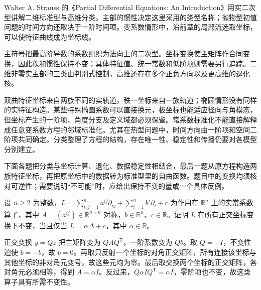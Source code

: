 \ProseParagraphBreak

Walter A. Strauss 的《Partial Differential Equations: An Introduction》\cite[Section 1.6]{Strauss2008Partial}用实二次型讲解二维标准型与高维分类。主部的惯性决定这里采用的类型名称；抛物型初值问题的时间方向还取决于一阶时间项。变系数情形中，沿前章的局部流选取坐标，可以使特征曲线成为坐标线。





\begin{chaptersummary}
主符号把最高阶导数的系数组织为法向上的二次型。坐标变换使主矩阵作合同变换，因此秩和惯性保持不变；具体特征值、统一常数和低阶项则需要另行追踪。二维非零实主部的三类由判别式控制，高维还存在多个正负方向以及更高维的退化核。

\ProseParagraphBreak

双曲特征坐标来自两族不同的实轨道，秩一坐标来自一族轨道；椭圆情形没有同样的实特征构造。某些特殊椭圆系数可以直接换元，极坐标也能适应径向与角模态，但坐标产生的一阶项、角度分支及定义域都必须保留。常系数标准化不能直接解释成任意变系数方程的邻域标准化。尤其在热型问题中，时间方向由一阶项和空间二阶项共同确定。分类整理了方程的结构，存在唯一性、稳定性和传播仍要对各模型分别建立。
\end{chaptersummary}

\BookExercises

下面各题把分类与坐标计算、退化、数据稳定性相结合，最后一题从原方程构造两族特征坐标，再把原坐标中的数据转为标准型里的自由函数。题目中的变换均须核对可逆性；需要说明“不可能”时，应给出保持不变的量或一个具体反例。

\begin{exercise}\label{b2:ex:08-orthogonal-invariance}
设 \(n\geq2\) 为整数，\(L=\sum_{i,j=1}^na^{ij}\partial_{ij}+\sum_{i=1}^n b^i\partial_i+c\) 为作用在 \(\mathbb R^n\) 上的实常系数算子，其中 \(A=(a^{ij})\in\mathbb R^{n\times n}\) 对称，\(b\in\mathbb R^n\)、\(c\in\mathbb R\)。证明 \(L\) 在所有正交坐标变换下不变，当且仅当 \(L=\alpha\Delta+c\)，其中 \(\alpha\in\mathbb R\)。
\end{exercise}
\begin{solution}
正交变换 \(y=Qz\) 把主矩阵变为 \(QAQ^{\mathsf T}\)，一阶系数变为 \(Qb\)。取 \(Q=-I\)，不变性迫使 \(b=-b\)，故 \(b=0\)。再取只反射一个坐标的对角正交矩阵，所有连接该坐标与其他坐标的非对角元变号，故这些元均为零。最后取交换两个坐标的正交矩阵，各对角元必须相等，得到 \(A=\alpha I\)。反过来，\(Q\alpha I Q^{\mathsf T}=\alpha I\)，零阶项也不变，故这类算子具有所需不变性。
\end{solution}

